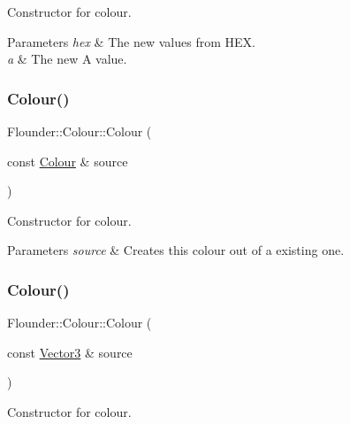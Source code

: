 Constructor for colour. 


\begin{DoxyParams}{Parameters}
{\em hex} & The new values from H\+EX. \\
\hline
{\em a} & The new A value. \\
\hline
\end{DoxyParams}
\mbox{\label{class_flounder_1_1_colour_a8f0b80aadc1a8c5b916e361e98969821}} 
\subsubsection{\texorpdfstring{Colour()}{Colour()}\hspace{0.1cm}{\footnotesize\ttfamily [4/6]}}
{\footnotesize\ttfamily Flounder\+::\+Colour\+::\+Colour (\begin{DoxyParamCaption}\item[{const \hyperlink{class_flounder_1_1_colour}{Colour} \&}]{source }\end{DoxyParamCaption})}



Constructor for colour. 


\begin{DoxyParams}{Parameters}
{\em source} & Creates this colour out of a existing one. \\
\hline
\end{DoxyParams}
\mbox{\label{class_flounder_1_1_colour_a1127b00a5afed1b311117a8f5d13224d}} 
\subsubsection{\texorpdfstring{Colour()}{Colour()}\hspace{0.1cm}{\footnotesize\ttfamily [5/6]}}
{\footnotesize\ttfamily Flounder\+::\+Colour\+::\+Colour (\begin{DoxyParamCaption}\item[{const \hyperlink{class_flounder_1_1_vector3}{Vector3} \&}]{source }\end{DoxyParamCaption})}



Constructor for colour. 


